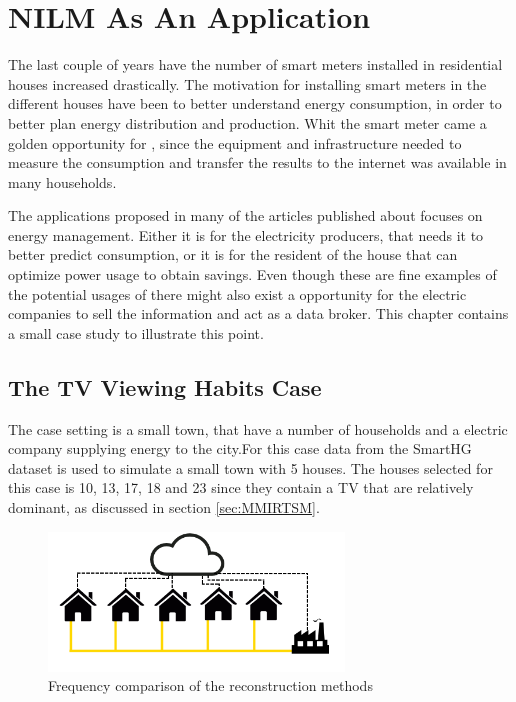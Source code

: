 \chapter{NILM As An Application} 
The last couple of years have the number of smart meters installed in residential houses increased drastically. The motivation for installing smart meters in the different houses have been to better understand energy consumption, in order to better plan energy distribution and production. Whit the smart meter came a golden opportunity for , since the equipment and infrastructure needed to measure the consumption and transfer the results to the internet was available in many households. 

The applications proposed in many of the articles published about  focuses on energy management. Either it is for the electricity producers, that needs it to better predict consumption, or it is for the resident of the house that can optimize power usage to obtain savings. Even though these are fine examples of the potential usages of  there might also exist a opportunity for the electric companies to sell the  information and act as a data broker. This chapter contains a small case study to illustrate this point. 


\section{The TV Viewing Habits Case}
The case setting is a small town, that have a number of households and a electric company supplying energy to the city.For this case data from the SmartHG dataset is used to simulate a small town with 5 houses. The houses selected for this case is 10, 13, 17, 18 and 23  since they contain a TV that are relatively dominant, as discussed in section \ref{sec:MMIRTSM}. 

\begin{figure}[H]
\centering
\includegraphics[width=0.7\textwidth]{billeder/CaseIlu.png}
\caption{Frequency comparison of the reconstruction methods}
\label{fig:CaseSetup}
\end{figure}

